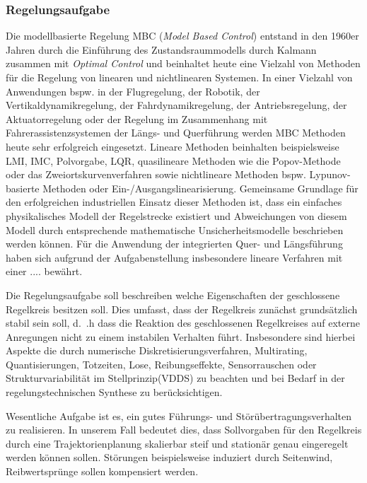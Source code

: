 \subsubsection*{Regelungsaufgabe}
Die modellbasierte Regelung MBC (\textit{Model Based Control}) 
entstand in den 1960er Jahren durch die Einführung des Zustandsraummodells durch Kalmann zusammen mit \textit{Optimal Control} 
und beinhaltet heute eine Vielzahl von Methoden für die Regelung von linearen und nichtlinearen Systemen. In einer Vielzahl von Anwendungen bspw. in der Flugregelung, der    
Robotik, der Vertikaldynamikregelung, der Fahrdynamikregelung, der Antriebsregelung, der Aktuatorregelung oder der Regelung im Zusammenhang mit Fahrerassistenzsystemen der Längs- und Querführung werden MBC Methoden heute sehr erfolgreich eingesetzt. Lineare Methoden beinhalten beispielsweise LMI, IMC, Polvorgabe, LQR, quasilineare Methoden wie die Popov-Methode oder das Zweiortskurvenverfahren sowie nichtlineare Methoden bspw. Lypunov-basierte Methoden oder Ein-/Ausgangslinearisierung.  Gemeinsame Grundlage für den erfolgreichen industriellen Einsatz dieser Methoden ist, dass ein einfaches physikalisches Modell der Regelstrecke existiert und Abweichungen von diesem Modell durch entsprechende mathematische Unsicherheitsmodelle beschrieben werden können. 
Für die Anwendung der integrierten Quer- und Längsführung haben sich aufgrund der Aufgabenstellung insbesondere lineare Verfahren mit einer ....  bewährt.
 
Die Regelungsaufgabe soll beschreiben welche Eigenschaften der geschlossene Regelkreis besitzen soll. Dies umfasst, dass der Regelkreis zunächst grundsätzlich stabil sein soll,
 d.~.h dass die Reaktion des geschlossenen Regelkreises auf externe Anregungen nicht zu einem instabilen Verhalten führt. Insbesondere sind hierbei Aspekte die durch numerische Diskretisierungsverfahren, Multirating, Quantisierungen, Totzeiten, Lose, Reibungseffekte, Sensorrauschen oder Strukturvariabilität im Stellprinzip(VDDS) zu beachten und bei Bedarf in der regelungstechnischen Synthese zu berücksichtigen.

Wesentliche Aufgabe ist es, ein gutes Führungs- und Störübertragungsverhalten zu realisieren. In unserem Fall bedeutet dies, dass Sollvorgaben für den Regelkreis durch eine Trajektorienplanung skalierbar steif und stationär genau eingeregelt werden können sollen. Störungen beispielsweise induziert durch Seitenwind, Reibwertsprünge sollen kompensiert werden.

